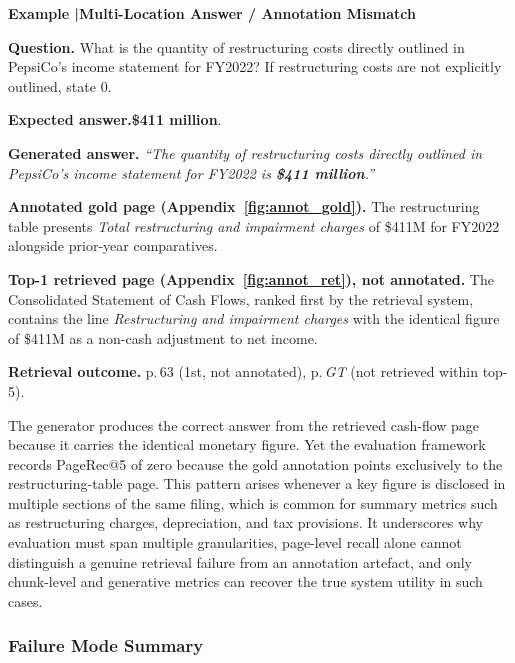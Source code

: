 \documentclass[12pt,twoside,maitrise]{dms}
\theoremstyle{definition}
\numberwithin{equation}{section}
\numberwithin{table}{chapter}
\numberwithin{figure}{chapter}
\newcounter{failex}
\newenvironment{failex}[1]{%
  \refstepcounter{failex}%
  \begin{mdframed}[
    linewidth=0.8pt,
    linecolor=black,
    innertopmargin=10pt,
    innerbottommargin=10pt,
    innerleftmargin=14pt,
    innerrightmargin=14pt,
    skipabove=\baselineskip,
    skipbelow=\baselineskip,
  ]
  \noindent\textbf{Example \thefailex\enspace|\enspace #1}
  \par\medskip
}{%
  \end{mdframed}%
}
\begin{document}
\begin{failex}{Multi-Location Answer / Annotation Mismatch}
\label{ex:annot_mismatch}

\noindent\textbf{Question.}\enspace
What is the quantity of restructuring costs directly outlined in PepsiCo's income
statement for FY2022? If restructuring costs are not explicitly outlined, state 0.

\medskip
\noindent\textbf{Expected answer.}\enspace \textbf{\$411 million}.

\medskip
\noindent\textbf{Generated answer.}\enspace
\textit{``The quantity of restructuring costs directly outlined in PepsiCo's income
statement for FY2022 is \textbf{\$411 million}.''}

\medskip
\noindent\textbf{Annotated gold page (Appendix~\ref{fig:annot_gold}).}\enspace
The restructuring table presents \emph{Total restructuring and impairment charges}
of \$411M for FY2022 alongside prior-year comparatives.

\medskip
\noindent\textbf{Top-1 retrieved page (Appendix~\ref{fig:annot_ret}), not annotated.}\enspace
The Consolidated Statement of Cash Flows, ranked first by the retrieval system,
contains the line \emph{Restructuring and impairment charges} with the identical
figure of \$411M as a non-cash adjustment to net income.

\medskip
\noindent\textbf{Retrieval outcome.}\enspace
p.\,63 (1st, not annotated),\enspace
p.\,\textit{GT} (not retrieved within top-5).
\end{failex}


\vspace{1em}


The generator produces the correct answer from the retrieved cash-flow page because it
carries the identical monetary figure.  Yet the evaluation framework records PageRec@5
of zero because the gold annotation points exclusively to the restructuring-table page.
This pattern arises whenever a key figure is disclosed in multiple sections of the same
filing, which is common for summary metrics such as restructuring charges, depreciation,
and tax provisions.  It underscores why evaluation must span multiple granularities,
page-level recall alone cannot distinguish a genuine retrieval failure from an annotation
artefact, and only chunk-level and generative metrics can recover the true system utility
in such cases.

\subsubsection{Failure Mode Summary}
\label{sec:fail_summary}
\end{document}

